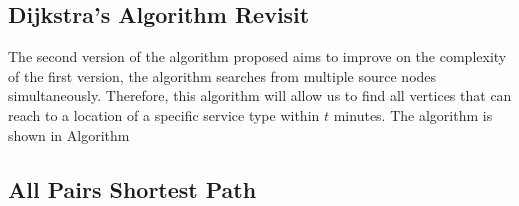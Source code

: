 \subsection{Dijkstra's Algorithm Revisit}

The second version of the algorithm proposed aims to improve on the complexity of the first version, the algorithm searches from multiple source nodes simultaneously. Therefore, this algorithm will allow us to find all vertices that can reach to a location of a specific service type within $t$ minutes. The algorithm is shown in Algorithm %

\subsection{All Pairs Shortest Path}


